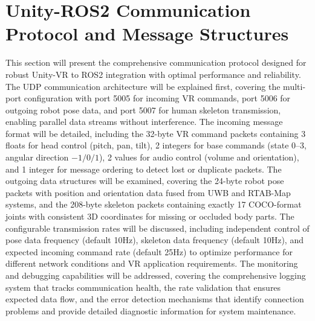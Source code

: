 \section{Unity-ROS2 Communication Protocol and Message Structures}
This section will present the comprehensive communication protocol designed for robust Unity-VR to ROS2 integration with optimal performance and reliability. The UDP communication architecture will be explained first, covering the multi-port configuration with port 5005 for incoming VR commands, port 5006 for outgoing robot pose data, and port 5007 for human skeleton transmission, enabling parallel data streams without interference. The incoming message format will be detailed, including the 32-byte VR command packets containing 3 floats for head control (pitch, pan, tilt), 2 integers for base commands (state 0--3, angular direction $-1/0/1$), 2 values for audio control (volume and orientation), and 1 integer for message ordering to detect lost or duplicate packets. The outgoing data structures will be examined, covering the 24-byte robot pose packets with position and orientation data fused from UWB and RTAB-Map systems, and the 208-byte skeleton packets containing exactly 17 COCO-format joints with consistent 3D coordinates for missing or occluded body parts. The configurable transmission rates will be discussed, including independent control of pose data frequency (default 10Hz), skeleton data frequency (default 10Hz), and expected incoming command rate (default 25Hz) to optimize performance for different network conditions and VR application requirements. The monitoring and debugging capabilities will be addressed, covering the comprehensive logging system that tracks communication health, the rate validation that ensures expected data flow, and the error detection mechanisms that identify connection problems and provide detailed diagnostic information for system maintenance.

